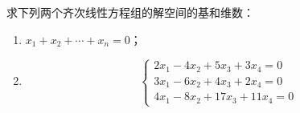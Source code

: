 \begin{problem}
求下列两个齐次线性方程组的解空间的基和维数：
\begin{enumerate}
    \item \(x_1+x_2+\cdots+x_n=0\)；
    \item \begin{equation*}
              \begin{cases}
                  2x_1-4x_2+5x_3+3x_4=0 \\
                  3x_1-6x_2+4x_3+2x_4=0 \\
                  4x_1-8x_2+17x_3+11x_4=0
              \end{cases}
          \end{equation*}
\end{enumerate}
\end{problem}
